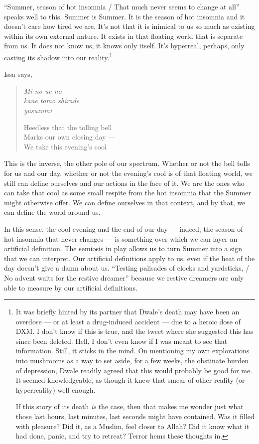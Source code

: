 \documentclass[12pt,oneside]{memoir}
\begin{document}
``Summer, season of hot insomnia / That much never seems to change at all'' speaks well to this. Summer is Summer. It is the season of hot insomnia and it doesn't care how tired we are. It's not that it is inimical to us so much as existing within its own external nature. It exists in that floating world that is separate from us. It does not know us, it knows only itself. It's hyperreal, perhaps, only casting its shadow into our reality.\footnote{It was briefly hinted by its partner that Dwale's death may have been an overdose --- or at least a drug-induced accident --- due to a heroic dose of DXM. I don't know if this is true, and the tweet where she suggested this has since been deleted. Hell, I don't even know if I was meant to see that information. Still, it sticks in the mind. On mentioning my own explorations into mushrooms as a way to set aside, for a few weeks, the obstinate burden of depression, Dwale readily agreed that this would probably be good for me. It seemed knowledgeable, as though it knew that smear of other reality (or hyperreality) well enough.\par If this story of its death \emph{is} the case, then that makes me wonder just what those last hours, last minutes, last seconds might have contained. Was it filled with pleasure? Did it, as a Muslim, feel closer to Allah? Did it know what it had done, panic, and try to retreat? Terror hems these thoughts in.}

Issa says,

\begin{verse}
\emph{Mi no ue no} \\
\emph{kane tomo shirade} \\
\emph{yusuzumi} 

Heedless that the tolling bell \\
Marks our own closing day --- \\
We take this evening's cool

\parencite[39]{issa}
\end{verse}

This is the inverse, the other pole of our spectrum. Whether or not the bell tolls for us and our day, whether or not the evening's cool is of that floating world, we still can define ourselves and our actions in the face of it. We are the ones who can take that cool as some small respite from the hot insomnia that the Summer might otherwise offer. We can define ourselves in that context, and by that, we can define the world around us.

In this sense, the cool evening and the end of our day --- indeed, the season of hot insomnia that never changes --- is something over which we can layer an artificial definition. The semiosis in play allows us to turn Summer into a sign that we can interpret. Our artificial definitions apply to us, even if the heat of the day doesn't give a damn about us. ``Testing palisades of clocks and yardsticks, / No advent waits for the restive dreamer'' because we restive dreamers are only able to measure by our artificial definitions.
\end{document}
